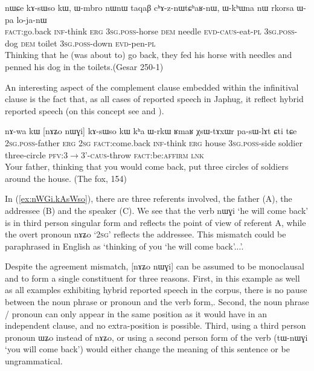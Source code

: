 \documentclass[oldfontcommands,oneside,a4paper,11pt]{article}
\newcommand{\ipa}[1]{{\phon \mbox{#1}}} %
\newcommand{\refb}[1]{(\ref{#1})}
\begin{document}
  \begin{exe}
\ex \label{ex:nWCe.kAsWso}
\gll 
\ipa{nɯɕe}  	\ipa{kɤ-sɯso}  	\ipa{kɯ,}  	\ipa{ɯ-mbro}  	\ipa{nɯnɯ}  	\ipa{taqaβ}  	\ipa{cʰɤ-z-nɯtɕʰaʁ-nɯ,}  	\ipa{ɯ-kʰɯna}  	\ipa{nɯ}  	\ipa{rkorsa}  	\ipa{ɯ-pa}  	\ipa{lo-ja-nɯ}  \\
\textsc{fact}:go.back \textsc{inf}-think \textsc{erg} \textsc{3sg.poss}-horse \textsc{dem} needle \textsc{evd-caus}-eat-\textsc{pl}   \textsc{3sg.poss}-dog \textsc{dem} toilet \textsc{3sg.poss}-down \textsc{evd}-pen-\textsc{pl} \\
\glt Thinking that he (was about to) go back, they fed his horse with needles and penned his dog in the toilets.(Gesar 250-1)
 \end{exe}
 
An interesting aspect  of the complement clause embedded within the infinitival clause is the fact that, as all cases of reported speech in Japhug, it reflect hybrid reported speech (on this concept see \citealt{tournadre08conjunct} and \citealt{aikhenvald08semidirect}).
 
  \begin{exe}
\ex \label{ex:nWGi.kAsWso}
\gll 
\ipa{nɤ-wa}  	\ipa{kɯ}  	[\ipa{nɤʑo}  	\ipa{nɯɣi}]  	\ipa{kɤ-sɯso}  	\ipa{kɯ}  	\ipa{kʰa}  	\ipa{ɯ-rkɯ}  	\ipa{ʁmaʁ}  	\ipa{χsɯ-tɤxɯr}  	\ipa{pa-sɯ-lɤt}  	\ipa{ɕti}  	\ipa{tɕe}  \\
\textsc{2sg.poss}-father \textsc{erg} \textsc{2sg} \textsc{fact}:come.back  \textsc{inf}-think \textsc{erg} house \textsc{3sg.poss}-side soldier three-circle \textsc{pfv:3$\rightarrow$3'-caus}-throw \textsc{fact}:be:\textsc{affirm} \textsc{lnk}\\
\glt Your father, thinking that you would come back,   put three circles of soldiers around the house. (The fox, 154)

 \end{exe}
 
In \refb{ex:nWGi.kAsWso}, there are three referents involved, the father (A), the addressee (B) and the speaker (C). We see that the verb  	\ipa{nɯɣi} `he will come back' is in third person singular form and reflects the point of view of referent A, while the overt pronoun \ipa{nɤʑo} `\textsc{2sg}' reflects the addressee. This mismatch could be paraphrased in English as `thinking of you `he will come back'...'.  

Despite the agreement mismatch, 	[\ipa{nɤʑo}  	\ipa{nɯɣi}] can be assumed to be monoclausal and to form a single constituent for three reasons. First, in this example as well as all examples exhibiting   hybrid reported speech in the corpus, there is no   pause between the noun phrase or pronoun and the verb form,. Second,  the noun phrase / pronoun can only appear in the same position as it would have in an independent clause, and no extra-position is possible. Third, using a third person pronoun \ipa{ɯʑo} instead of \ipa{nɤʑo}, or using a second person form of the verb (\ipa{tɯ-nɯɣi} `you will come back') would either change the meaning of this sentence or be ungrammatical.
 
\end{document}
